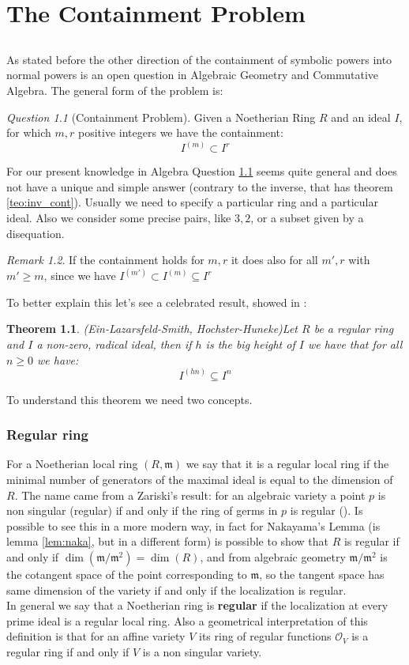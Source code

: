 \documentclass[notitlepage, a4]{book}
\theoremstyle{plain}
\newtheorem{teo}{Theorem}[section]
\theoremstyle{remark}
\newtheorem{rem}{Remark}
\newtheorem{que}[rem]{Question}
\theoremstyle{definition}
\newcommand{\mm}{\mathfrak{m}}
\newcommand{\cont}[2]{ I^{(#1)} \subseteq I^{#2}}
\newcounter{que}
\begin{document}
\chapter{The Containment Problem} \label{cha:cont}
\section*{}
	As stated before the other direction of the containment of symbolic powers into normal powers is an open question in Algebraic Geometry and Commutative Algebra. The general form of the problem is:
	\begin{que}[Containment Problem] \label{que:cont}
		Given a Noetherian Ring $ R $ and an ideal $ I $, for which $ m,r $ positive integers we have the containment:
		$$ I^{(m)} \subset I^r $$
	\end{que}
	For our present knowledge in Algebra Question \ref{que:cont} seems quite general and does not have a unique and simple answer (contrary to the inverse, that has theorem \ref{teo:inv_cont}). Usually we need to specify a particular ring and a particular ideal. Also we consider some precise pairs, like $ 3,2 $, or a subset given by a disequation. 
	\begin{rem}
	If the containment holds for $ m,r $ it does also for all $ m' ,r $ with $ m'\geq m $, since we have $ I^{(m')} \subset \cont{m}{r} $
	\end{rem}
	To better explain this let's see a celebrated result, showed in \cite{HocHun02,EinLazSmi01}:
	\begin{teo}{(Ein-Lazarsfeld-Smith, Hochster-Huneke)}\label{teo:cont:bigh}
	Let $ R $ be a regular ring and $ I $ a non-zero, radical ideal, then if $ h $ is the big height of $ I $ we have that for all $ n \geq 0 $ we have:
	\[ \cont{hn}{n}\]	
	\end{teo} 
	
	To understand this theorem we need two concepts.
	\subsection{Regular ring}
	For a Noetherian local ring $ (R,\mm) $ we say that it is a regular local ring if the minimal number of generators of the maximal ideal is equal to the dimension of $ R $. The name came from a Zariski's result: for an algebraic variety a point $ p $ is non singular (regular) if and only if the ring of germs in $ p $ is regular (\cite{Zar40}). Is possible to see this in a more modern way, in fact for Nakayama's Lemma (is lemma \ref{lem:naka}, but in a different form) is possible to show that $ R $ is regular if and only if $ \dim(\mm / \mm^2 ) = \dim (R) $, and from algebraic geometry $ \mm /\mm^2 $ is the cotangent space of the point corresponding to $ \mm $, so the tangent space has same dimension of the variety if and only if the localization is regular.\\
	In general we say that a Noetherian ring is \textbf{regular} if the localization at every prime ideal is a regular local ring. Also a geometrical interpretation of this definition is that for an affine variety $ V $ its ring of regular functions $ \mathcal{O}_V $ is a regular ring if and only if $ V $ is a non singular variety. 
	
\end{document}
